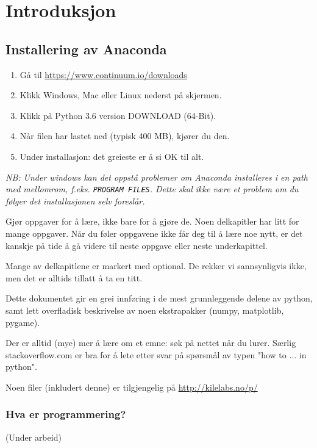 \chapter{Introduksjon}
\section{Installering av Anaconda}
\begin{enumerate}
\item Gå til \url{https://www.continuum.io/downloads}
\item Klikk Windows, Mac eller Linux nederst på skjermen.
\item Klikk på Python 3.6 version  DOWNLOAD  (64-Bit).
\item Når filen har lastet ned (typisk 400 MB), kjører du den.
\item Under installasjon: det greieste er å si OK til alt.
\end{enumerate}
{\em NB: Under windows kan det oppstå problemer om Anaconda installeres i en path med mellomrom, f.eks. \texttt{PROGRAM FILES}. Dette skal ikke være et problem om du følger det installasjonen selv foreslår.}

Gjør oppgaver for å lære, ikke bare for å gjøre de. Noen delkapitler har litt for mange oppgaver. Når du føler oppgavene ikke får deg til å lære noe nytt, er det kanskje på tide å gå videre til neste oppgave eller neste underkapittel. 

Mange av delkapitlene er markert med optional. De rekker vi sannsynligvis ikke, men det er alltids tillatt å ta en titt. 

Dette dokumentet gir en grei innføring i de mest grunnleggende delene av python,  samt lett overfladisk beskrivelse av noen ekstrapakker (numpy, matplotlib, pygame). 

Der er alltid (mye) mer å lære om et emne: søk på nettet når du lurer. Særlig stackoverflow.com er bra for å lete etter svar på spørsmål av typen "how to ... in python". 

Noen filer (inkludert denne) er tilgjengelig på \url{http://kilelabs.no/p/}

\mainmatter



\subsection{Hva er programmering?}
(Under arbeid)